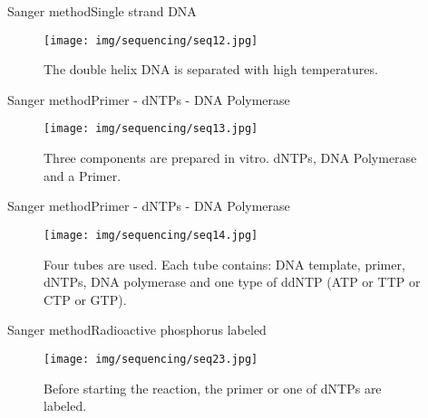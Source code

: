 \documentclass[10pt]{beamer}
\newcommand{\1}{
	\setbeamertemplate{background}{
		\texttt{[image: img/1]}
		\tikz[overlay] \fill[fill opacity=0.75,fill=white] (0,0) rectangle (-\paperwidth,\paperheight);
	}
}
\begin{document}
\begin{frame}{Sanger method}{Single strand DNA}
	\begin{figure}[]
		\centering
		\texttt{[image: img/sequencing/seq12.jpg]}
		\label{img:mot2}
		\caption{The double helix DNA is separated with high temperatures.}
	\end{figure}
\end{frame}


\begin{frame}{Sanger method}{Primer - dNTPs - DNA Polymerase}
	\begin{figure}[]
		\centering
		\texttt{[image: img/sequencing/seq13.jpg]}
		\label{img:mot2}
		\caption{Three components are prepared in vitro. dNTPs, DNA Polymerase and a Primer.}
	\end{figure}
\end{frame}






\begin{frame}{Sanger method}{Primer - dNTPs - DNA Polymerase}
	\begin{figure}[]
		\centering
		\texttt{[image: img/sequencing/seq14.jpg]}
		\label{img:mot2}
		\caption{Four tubes are used. Each tube contains: DNA template, primer, dNTPs, DNA polymerase and one type of ddNTP (ATP or TTP or CTP or GTP).}
	\end{figure}
\end{frame}



\begin{frame}{Sanger method}{Radioactive phosphorus labeled}
	\begin{figure}[]
		\centering
		\texttt{[image: img/sequencing/seq23.jpg]}
		\label{img:mot2}
		\caption{Before starting the reaction, the primer or one of dNTPs are labeled.}
	\end{figure}
\end{frame}
\end{document}
